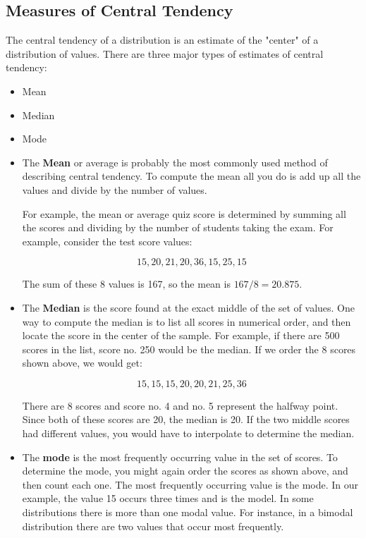 \documentclass[12pt]{article}
\begin{document}
\subsection{Measures of Central Tendency}
The central tendency of a distribution is an estimate of the "center" of a distribution of values. There are three major types of estimates of central tendency:

\begin{itemize}
\item Mean
\item Median
\item Mode
\end{itemize}

\begin{itemize}
\item The \textbf{Mean} or average is probably the most commonly used method of describing central tendency. To compute the mean all you do is add up all the values and divide by the number of values.

For example, the mean or average quiz score is determined by summing all the scores and dividing by the number of students taking the exam. For example, consider the test score values:

\[15, 20, 21, 20, 36, 15, 25, 15\]

The sum of these 8 values is 167, so the mean is $167/8 = 20.875$.

\item The \textbf{Median} is the score found at the exact middle of the set of values. One way to compute the median is to list all scores in numerical order, and then locate the score in the center of the sample. For example, if there are 500 scores in the list, score no. 250 would be the median. If we order the 8 scores shown above, we would get:

\[15,15,15,20,20,21,25,36\]

There are 8 scores and score no. 4 and no. 5 represent the halfway point. Since both of these scores are 20, the median is 20. If the two middle scores had different values, you would have to interpolate to determine the median.

\item The \textbf{mode} is the most frequently occurring value in the set of scores. To determine the mode, you might again order the scores as shown above, and then count each one. The most frequently occurring value is the mode. In our example, the value 15 occurs three times and is the model. In some distributions there is more than one modal value. For instance, in a bimodal distribution there are two values that occur most frequently.
\end{itemize}
\end{document}
